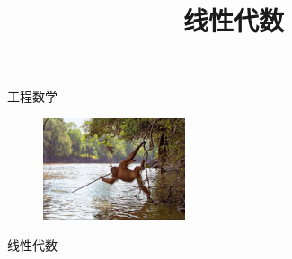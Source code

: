 \documentclass[adobefonts,11pt,a4papaper]{ctexbook}
\title{线性代数}
\begin{document}
\begin{titlepage} %
\vspace*{20pt}
\centerline{\LARGE 工程数学}
\begin{figure}
  \includegraphics[height=85pt]{head.jpg}
\end{figure}
\centerline{\LARGE 线性代数}
\end{titlepage}
\thispagestyle{empty}
\newpage  
\tableofcontents
\thispagestyle{empty}
\clearpage
{}


\end{document}
